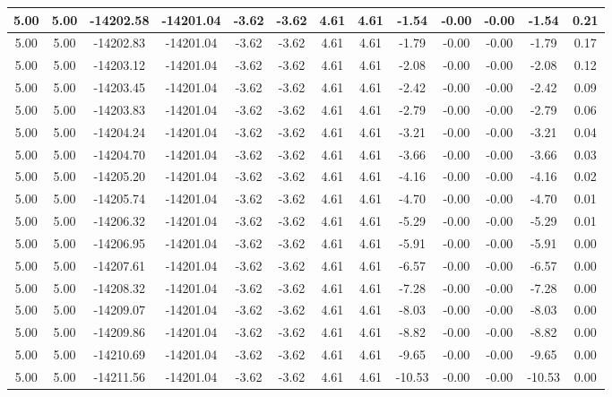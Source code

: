 \begin{table}[htbp]
\begin{adjustbox}{angle=90}
\begin{tabular}{|c|c|c|c|c|c|c|c|c|c|c|c|c|}
 5.00 & 5.00 & -14202.58 & -14201.04 & -3.62 & -3.62 & 4.61 & 4.61 & -1.54 & -0.00 & -0.00 & -1.54 & 0.21\\ \hline
 5.00 & 5.00 & -14202.83 & -14201.04 & -3.62 & -3.62 & 4.61 & 4.61 & -1.79 & -0.00 & -0.00 & -1.79 & 0.17\\ \hline
 5.00 & 5.00 & -14203.12 & -14201.04 & -3.62 & -3.62 & 4.61 & 4.61 & -2.08 & -0.00 & -0.00 & -2.08 & 0.12\\ \hline
 5.00 & 5.00 & -14203.45 & -14201.04 & -3.62 & -3.62 & 4.61 & 4.61 & -2.42 & -0.00 & -0.00 & -2.42 & 0.09\\ \hline
 5.00 & 5.00 & -14203.83 & -14201.04 & -3.62 & -3.62 & 4.61 & 4.61 & -2.79 & -0.00 & -0.00 & -2.79 & 0.06\\ \hline
 5.00 & 5.00 & -14204.24 & -14201.04 & -3.62 & -3.62 & 4.61 & 4.61 & -3.21 & -0.00 & -0.00 & -3.21 & 0.04\\ \hline
 5.00 & 5.00 & -14204.70 & -14201.04 & -3.62 & -3.62 & 4.61 & 4.61 & -3.66 & -0.00 & -0.00 & -3.66 & 0.03\\ \hline
 5.00 & 5.00 & -14205.20 & -14201.04 & -3.62 & -3.62 & 4.61 & 4.61 & -4.16 & -0.00 & -0.00 & -4.16 & 0.02\\ \hline
 5.00 & 5.00 & -14205.74 & -14201.04 & -3.62 & -3.62 & 4.61 & 4.61 & -4.70 & -0.00 & -0.00 & -4.70 & 0.01\\ \hline
 5.00 & 5.00 & -14206.32 & -14201.04 & -3.62 & -3.62 & 4.61 & 4.61 & -5.29 & -0.00 & -0.00 & -5.29 & 0.01\\ \hline
 5.00 & 5.00 & -14206.95 & -14201.04 & -3.62 & -3.62 & 4.61 & 4.61 & -5.91 & -0.00 & -0.00 & -5.91 & 0.00\\ \hline
 5.00 & 5.00 & -14207.61 & -14201.04 & -3.62 & -3.62 & 4.61 & 4.61 & -6.57 & -0.00 & -0.00 & -6.57 & 0.00\\ \hline
 5.00 & 5.00 & -14208.32 & -14201.04 & -3.62 & -3.62 & 4.61 & 4.61 & -7.28 & -0.00 & -0.00 & -7.28 & 0.00\\ \hline
 5.00 & 5.00 & -14209.07 & -14201.04 & -3.62 & -3.62 & 4.61 & 4.61 & -8.03 & -0.00 & -0.00 & -8.03 & 0.00\\ \hline
 5.00 & 5.00 & -14209.86 & -14201.04 & -3.62 & -3.62 & 4.61 & 4.61 & -8.82 & -0.00 & -0.00 & -8.82 & 0.00\\ \hline
 5.00 & 5.00 & -14210.69 & -14201.04 & -3.62 & -3.62 & 4.61 & 4.61 & -9.65 & -0.00 & -0.00 & -9.65 & 0.00\\ \hline
 5.00 & 5.00 & -14211.56 & -14201.04 & -3.62 & -3.62 & 4.61 & 4.61 & -10.53 & -0.00 & -0.00 & -10.53 & 0.00\\ \hline

\end{tabular}
\end{adjustbox}
\end{table}
